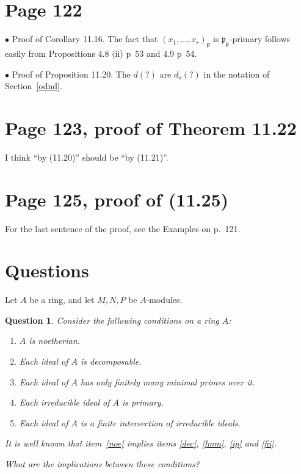 \documentclass[12pt]{article}
\newcommand{\mf}{\mathfrak}
\newcommand{\bu}{\bullet}
\newtheorem{qn}[thm]{Question}
\begin{document}
\section{Page 122}%

$\bu$ Proof of Corollary 11.16. The fact that $(x_1,\dots,x_r)_{\mf p}$ is $\mf p_{\mf p}$-primary follows easily from Propositions 4.8 (ii) p~53 and 4.9 p~54.

$\bu$ Proof of Proposition 11.20. The $d(?)$ are $d_o(?)$ in the notation of Section~\ref{odnd}.

\section{Page 123, proof of Theorem 11.22}%

I think ``by (11.20)'' should be ``by (11.21)''.

\section{Page 125, proof of (11.25)}%

For the last sentence of the proof, see the Examples on p.~121.

\section{Questions}%

Let $A$ be a ring, and let $M,N,P$ be $A$-modules.



\begin{qn}
Consider the following conditions on a ring $A$:

\begin{enumerate}
\item\label{noe} $A$ is noetherian.
\item\label{dec} Each ideal of $A$ is decomposable.
\item\label{fmm} Each ideal of $A$ has only finitely many minimal primes over it.
\item\label{ip} Each irreducible ideal of $A$ is primary.
\item\label{fii} Each ideal of $A$ is a finite intersection of irreducible ideals.
\end{enumerate}

It is well known that item~\ref{noe} implies items \ref{dec}, \ref{fmm}, \ref{ip} and \ref{fii}.%

What are the implications between these conditions?
\end{qn}
\end{document}

